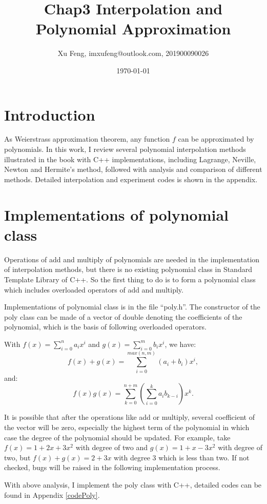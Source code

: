 \documentclass[12pt]{article}
\title{Chap3 Interpolation and Polynomial Approximation}
\author{Xu Feng, imxufeng@outlook.com, 201900090026}
\date{\today}
\begin{document}

\maketitle

\section{Introduction}

As Weierstrass approximation theorem, any function $f$ can be approximated by polynomials. In this work, I review several polynomial interpolation methods illustrated in the book \cite{1} with C++ implementations, including Lagrange, Neville, Newton and Hermite's method, followed with analysis and comparison of different methods. Detailed interpolation and experiment codes is shown in the appendix.

\section{Implementations of polynomial class}

Operations of add and multiply of polynomials are needed in the implementation of interpolation methods, but there is no existing polynomial class in Standard Template Library of C++. So the first thing to do is to form a polynomial class which includes overloaded operators of add and multiply.

Implementations of polynomial class is in the file ``poly.h''. The constructor of the poly class can be made of a vector of double denoting the coefficients of the polynomial, which is the basis of following overloaded operators.

With $ f(x) = \sum_{i=0}^{n} a_i x^i$ and $g(x) = \sum_{i=0}^{m} b_i x^i$, we have:
 $$f(x)+g(x)=\sum_{i=0}^{max(n,m)}(a_i+b_i)x^i, $$ and:
$$ f(x)g(x) = \sum_{k=0}^{n+m}(\sum_{i=0}^{k} a_i b_{k-i}) x^k. $$

It is possible that after the operations like add or multiply, several coefficient of the vector will be zero, especially the highest term of the polynomial in which case the degree of the polynomial should be updated. For example, take $f(x)=1+2x+3x^2$ with degree of two and $g(x)=1+x-3x^2$ with degree of two, but $f(x)+g(x)=2+3x$ with degree 3 which is less than two. If not checked, bugs will be raised in the following implementation process.

With above analysis, I implement the poly class with C++, detailed codes can be found in Appendix \ref{codePoly}.
\end{document}
